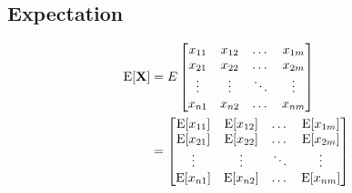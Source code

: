 \documentclass[../../main.tex]{subfiles}
\begin{document}
\subsection{Expectation}
\begin{align*}
    \mathrm{E}[\mathbf{X}] &= E
    \begin{bmatrix}
        x_{11} & x_{12} & \dots & x_{1m} \\
        x_{21} & x_{22} & \dots & x_{2m} \\
        \vdots & \vdots & \ddots & \vdots \\
        x_{n1} & x_{n2} & \dots & x_{nm} \\
    \end{bmatrix}\\
    &= \begin{bmatrix}
        \mathrm{E}[x_{11}] & \mathrm{E}[x_{12}] & \dots & \mathrm{E}[x_{1m}] \\
        \mathrm{E}[x_{21}] & \mathrm{E}[x_{22}] & \dots & \mathrm{E}[x_{2m}] \\
        \vdots & \vdots & \ddots & \vdots \\
        \mathrm{E}[x_{n1}] & \mathrm{E}[x_{n2}] & \dots & \mathrm{E}[x_{nm}] \\
    \end{bmatrix}
\end{align*}
\end{document}
